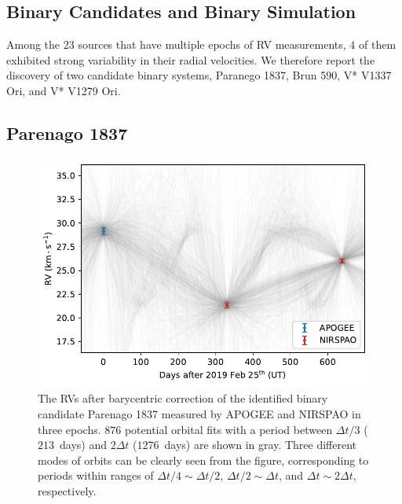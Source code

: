\documentclass[12pt]{ucsddissertation}
\begin{document}
\begin{CJK*}{UTF8}{gbsn}
\section{Binary Candidates and Binary Simulation}
\label{onc-sec:binary}
Among the $23$ sources that have multiple epochs of RV measurements, $4$ of them exhibited strong variability in their radial velocities. We therefore report the discovery of two candidate binary systems, Paranego 1837, Brun 590, V* V1337 Ori, and V* V1279 Ori.

\subsection{Parenago 1837}
\label{onc-subsec:parenago}
\begin{figure}[htb!]
    \centering
    \includegraphics[width=0.7\linewidth]{figures/chapter1/Parenago1837-Orbital_Fits.pdf}
    \caption[Parenago 1837 orbital fit]{The RVs after barycentric correction of the identified binary candidate Parenago 1837 measured by APOGEE and NIRSPAO in three epochs. $876$ potential orbital fits with a period between $\Delta t/3$ ($213$~days) and $2\Delta t$ ($1276$~days) are shown in gray. Three different modes of orbits can be clearly seen from the figure, corresponding to periods within ranges of $\Delta t/4\sim\Delta t/2$, $\Delta t/2\sim\Delta t$, and $\Delta t\sim2\Delta t$, respectively.}
    \label{fig:orbital fits}
\end{figure}


\end{CJK*}
\end{document}
